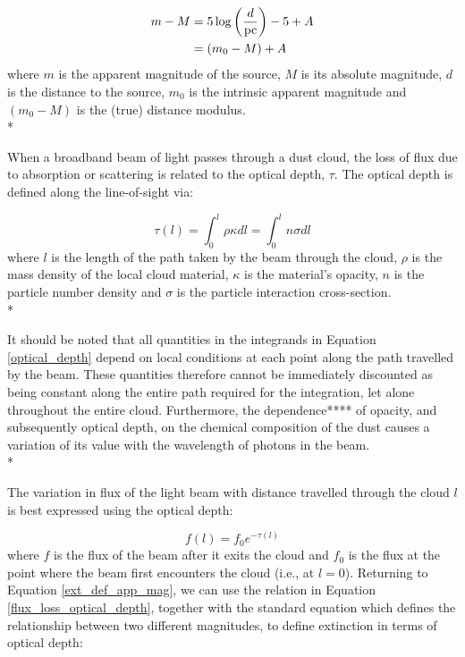 \documentclass[12pt, a4paper]{report}
\begin{document}
\begin{align}
\begin{split}
m - M &= 5\log\left(\frac{d}{\textnormal{pc}}\right) - 5 + A \\
      &= (m_{0} - M) + A
\end{split}
\label{ext_def_app_mag}
\end{align}
where $m$ is the apparent magnitude of the source, $M$ is its absolute magnitude, $d$ is the distance to the source, $m_{0}$ is the intrinsic apparent magnitude and $(m_{0} - M)$ is the (true) distance modulus. \\*


When a broadband beam of light passes through a dust cloud, the loss of flux due to absorption or scattering is related to the optical depth, $\tau$. The optical depth is defined along the line-of-sight via:

\begin{equation}
\tau(l) = \int_{0}^{l} \rho \kappa dl = \int_{0}^{l} n \sigma dl
\label{optical_depth}
\end{equation}
where $l$ is the length of the path taken by the beam through the cloud, $\rho$ is the mass density of the local cloud material, $\kappa$ is the material's opacity, $n$ is the particle number density and $\sigma$ is the particle interaction cross-section.\\*

It should be noted that all quantities in the integrands in Equation \ref{optical_depth} depend on local conditions at each point along the path travelled by the beam. These quantities therefore cannot be immediately discounted as being constant along the entire path required for the integration, let alone throughout the entire cloud. Furthermore, the dependence**** of opacity, and subsequently optical depth, on the chemical composition of the dust causes a variation of its value with the wavelength of photons in the beam.\\*

The variation in flux of the light beam with distance travelled through the cloud $l$ is best expressed using the optical depth:

\begin{equation}
f(l) = f_{0} e^{-\tau(l)}
\label{flux_loss_optical_depth}
\end{equation}
where $f$ is the flux of the beam after it exits the cloud and $f_{0}$ is the flux at the point where the beam first encounters the cloud (i.e., at $l = 0$). Returning to Equation \ref{ext_def_app_mag}, we can use the relation in Equation \ref{flux_loss_optical_depth}, together with the standard equation which defines the relationship between two different magnitudes, to define extinction in terms of optical depth:
\end{document}
